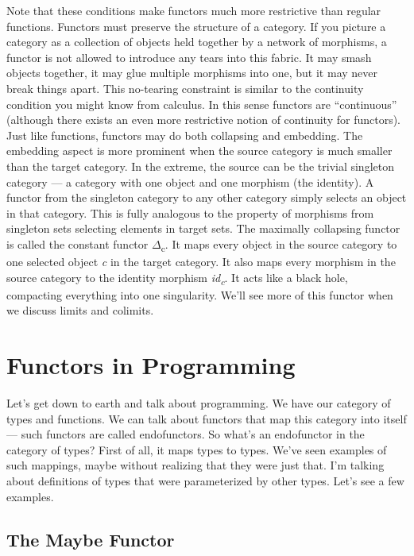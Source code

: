 \noindent
Note that these
conditions make functors much more restrictive than regular functions.
Functors must preserve the structure of a category. If you picture a
category as a collection of objects held together by a network of
morphisms, a functor is not allowed to introduce any tears into this
fabric. It may smash objects together, it may glue multiple morphisms
into one, but it may never break things apart. This no-tearing
constraint is similar to the continuity condition you might know from
calculus. In this sense functors are ``continuous'' (although there
exists an even more restrictive notion of continuity for functors). Just
like functions, functors may do both collapsing and embedding. The
embedding aspect is more prominent when the source category is much
smaller than the target category. In the extreme, the source can be the
trivial singleton category --- a category with one object and one
morphism (the identity). A functor from the singleton category to any
other category simply selects an object in that category. This is fully
analogous to the property of morphisms from singleton sets selecting
elements in target sets. The maximally collapsing functor is called the
constant functor \ensuremath{\Delta}\textsubscript{c}. It maps every object in the source
category to one selected object \emph{c} in the target category. It also
maps every morphism in the source category to the identity morphism
\emph{id\textsubscript{c}}. It acts like a black hole, compacting
everything into one singularity. We'll see more of this functor when we
discuss limits and colimits.

\section{Functors in Programming}\label{functors-in-programming}

Let's get down to earth and talk about programming. We have our category
of types and functions. We can talk about functors that map this
category into itself --- such functors are called endofunctors. So
what's an endofunctor in the category of types? First of all, it maps
types to types. We've seen examples of such mappings, maybe without
realizing that they were just that. I'm talking about definitions of
types that were parameterized by other types. Let's see a few examples.

\subsection{The Maybe Functor}\label{the-maybe-functor}

